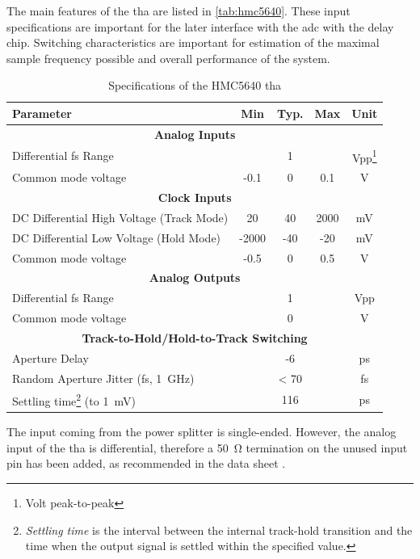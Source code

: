 The main features of the \gls{tha} are listed in \autoref{tab:hmc5640}.
These input specifications are important for the later interface with the \gls{adc} with the delay chip.
Switching characteristics are important for estimation of the maximal sample frequency possible and overall performance of the system.
\begin{table}[tb]
	\caption[HMC5640 Characteristics]{Specifications of the HMC5640 \gls{tha}}
	\label{tab:hmc5640}
	\begin{minipage}{\textwidth}
		\centering
		\begin{tabularx}{\textwidth}{Xcccc}
			\toprule
			\textbf{Parameter} & \textbf{Min} & \textbf{Typ.} & \textbf{Max} & \textbf{Unit}\\
			\midrule
			\multicolumn{5}{c}{\textbf{Analog Inputs}}  \\
			Differential \gls{fs} Range & & 1 & & Vpp\footnote{Volt peak-to-peak}\\
			Common mode voltage & -0.1 & 0 & 0.1 & V\\[0.3cm]
		    \multicolumn{5}{c}{\textbf{Clock Inputs}}  \\
			DC Differential High Voltage (Track Mode) & 20 & 40 & 2000 & mV\\
			DC Differential Low Voltage (Hold Mode) & -2000 & -40 & -20 & mV\\
			Common mode voltage & -0.5 & 0 & 0.5 & V\\[0.3cm]
		    \multicolumn{5}{c}{\textbf{Analog Outputs}}  \\
			Differential \gls{fs} Range &  & 1 && Vpp\\
			Common mode voltage & & 0 & & V\\[0.3cm]
			\multicolumn{5}{c}{\textbf{Track-to-Hold/Hold-to-Track Switching}} \\
			Aperture Delay & & -6 &  & ps\\
			Random Aperture Jitter (\gls{fs}, \SI{1}{\giga \hertz}) & & < 70 & & fs\\
			Settling time\footnote{\textit{Settling time} is the interval between the internal track-hold transition and the time when the output signal is settled within the specified value.} (to \SI{1}{\milli \volt}) &	&  116 & & ps \\
			\bottomrule
		\end{tabularx}
	\end{minipage}
\end{table}

The input coming from the power splitter is single-ended.
However, the analog input of the \gls{tha} is differential, therefore a \SI{50}{\ohm} termination on the unused input pin has been added, as recommended in the data sheet \cite{hmc5640}.

